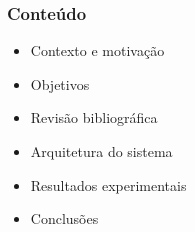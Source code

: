 \begin{frame}
	\frametitle{Conte\'{u}do}
	\begin{itemize}
		\item Contexto e motivaç\~{a}o
		\item Objetivos
		\item Revis\~{a}o bibliogr\'{a}fica
		\item Arquitetura do sistema
		\item Resultados experimentais
		\item Conclus\~{o}es
	\end{itemize}
\end{frame}